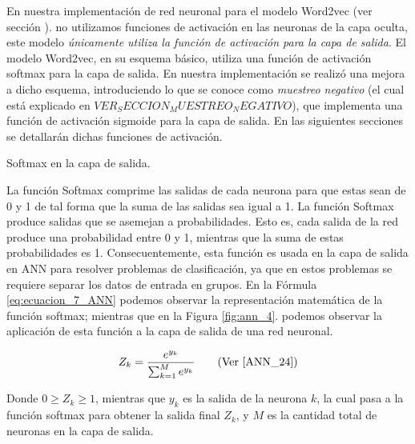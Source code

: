 \documentclass[12pt,a4paper]{article}
\makeatletter
\renewcommand\paragraph{\@startsection{paragraph}{4}{\z@}
            {-2.5ex\@plus -1ex \@minus -.25ex}
            {1.25ex \@plus .25ex}
            {\normalfont\normalsize\bfseries}}
\makeatother
\begin{document}
\begin{sloppypar}
En nuestra implementación de red neuronal para el modelo Word2vec (ver sección \textit{}). no utilizamos funciones de activación en las neuronas de la capa oculta, este modelo \textit{únicamente utiliza la función de activación para la capa de salida}. 
El modelo Word2vec, en su esquema básico, utiliza una función de activación softmax para la capa de salida. En nuestra implementación se realizó una mejora a dicho esquema, introduciendo lo que se conoce como \textit{muestreo negativo} (el cual está explicado en $VER_SECCION_MUESTREO_NEGATIVO$), que implementa una función de activación sigmoide para la capa de salida. En las siguientes secciones se detallarán dichas funciones de activación.

\paragraph{Softmax en la capa de salida.}

La función Softmax comprime las salidas de cada neurona para que estas sean de 0 y 1 de tal forma que la suma de las salidas sea igual a 1. La función Softmax produce salidas que se asemejan a probabilidades. Esto es, cada salida de la red produce una probabilidad entre 0 y 1, mientras que la suma de estas probabilidades es 1. Consecuentemente, esta función es usada en la capa de salida en ANN para resolver problemas de clasificación, ya que en estos problemas se requiere separar los datos de entrada en grupos. 
En la Fórmula \ref{eq:ecuacion_7_ANN} podemos observar la representación matemática de la función softmax; mientras que en la Figura \ref{fig:ann_4}. podemos observar la aplicación de esta función a la capa de salida de una red neuronal.

\begin{equation}\label{eq:ecuacion_7_ANN}
Z_k= \frac{e^{y_k}}{\sum_{k=1}^{M}e^{y_k}} \qquad \text{(Ver \cite{ANN_24})}
\end{equation}

Donde $0 \geq Z_k \geq 1$, mientras que $y_k$ es la salida de la neurona $k$, la cual pasa a la función softmax para obtener la salida final $Z_k$, y $M$ es la cantidad total de neuronas en la capa de salida.     


\end{sloppypar}
\end{document}
